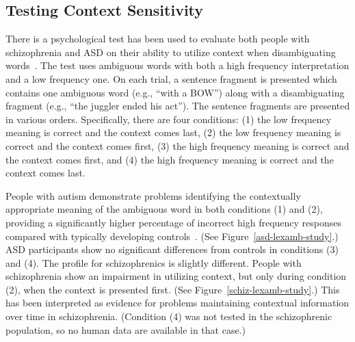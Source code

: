 \subsection{Testing Context Sensitivity}
There is a psychological test has been used to evaluate both people with schizophrenia and ASD on their ability to utilize context when disambiguating words~\cite{CohenJD:1992:Schizophrenia,HappeF:1997:WCCHomographs}. The test uses ambiguous words with both a high frequency interpretation and a low frequency one. On each trial, a sentence fragment is presented which contains one ambiguous word (e.g., ``with a BOW'') along with a disambiguating fragment (e.g., ``the juggler ended his act''). The sentence fragments are presented in various orders. Specifically, there are four conditions: (1) the low frequency meaning is correct and the context comes last, (2) the low frequency meaning is correct and the context comes first, (3) the high frequency meaning is correct and the context comes first, and (4) the high frequency meaning is correct and the context comes last.

People with autism demonstrate problems identifying the contextually appropriate meaning of the ambiguous word in both conditions (1) and (2), providing a significantly higher percentage of incorrect high frequency responses compared with typically developing controls~\cite{HappeF:1997:WCCHomographs}. (See Figure~\ref{asd-lexamb-study}.) ASD participants show no significant differences from controls in conditions (3) and (4). The profile for schizophrenics is slightly different. People with schizophrenia show an impairment in utilizing context, but only during condition (2), when the context is presented first. (See Figure~\ref{schiz-lexamb-study}.) This has been interpreted as evidence for problems maintaining contextual information over time in schizophrenia. (Condition (4) was not tested in the schizophrenic population, so no human data are available in that case.)

